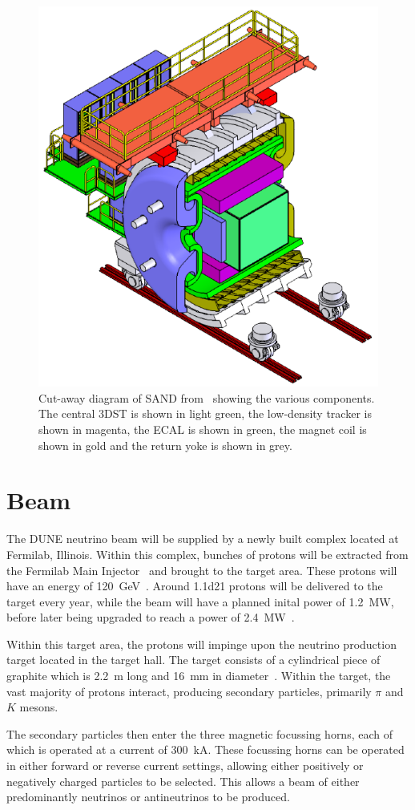 \begin{figure}[h]
  \centering
  \includegraphics[width=.55\linewidth]{files/figures/dune_detector/sandDiag}
  \caption[Cut-away diagram of SAND]{Cut-away diagram of SAND from~\cite{ndCdr} showing the various components. The central 3DST is shown in light green, the low-density tracker is shown in magenta, the ECAL is shown in green, the magnet coil is shown in gold and the return yoke is shown in grey.}
  \label{fig:sandDiag}
\end{figure}

\section{Beam}
\label{sec:dune:beam}

The DUNE neutrino beam will be supplied by a newly built complex located at Fermilab, Illinois.
Within this complex, bunches of protons will be extracted from the Fermilab Main Injector~\cite{mainInjector} and brought to the target area.
These protons will have an energy of \SI{120}{\giga\electronvolt}~\cite{duneBeam}.
Around \num{1.1d21} protons will be delivered to the target every year, while the beam will have a planned inital power of \SI{1.2}{\mega\watt}, before later being upgraded to reach a power of \SI{2.4}{\mega\watt}~\cite{duneBeam}.

Within this target area, the protons will impinge upon the neutrino production target located in the target hall.
The target consists of a cylindrical piece of graphite which is \SI{2.2}{\metre} long and \SI{16}{\milli\metre} in diameter~\cite{duneBeam}.
Within the target, the vast majority of protons interact, producing secondary particles, primarily $\pi$ and $K$ mesons.

The secondary particles then enter the three magnetic focussing horns, each of which is operated at a current of \SI{300}{\kilo\ampere}.
These focussing horns can be operated in either forward or reverse current settings, allowing either positively or negatively charged particles to be selected.
This allows a beam of either predominantly neutrinos or antineutrinos to be produced.

